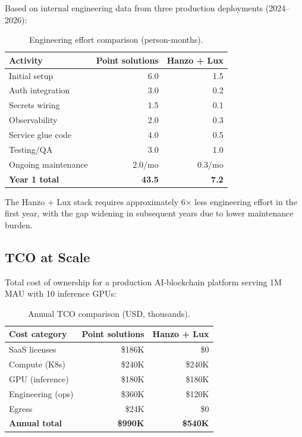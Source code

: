\documentclass[11pt,twocolumn]{article}
\begin{document}
Based on internal engineering data from three production deployments (2024--2026):

\begin{table}[H]
\centering
\caption{Engineering effort comparison (person-months).}
\footnotesize
\begin{tabular}{@{}lrr@{}}
\toprule
Activity & Point solutions & Hanzo + Lux \\
\midrule
Initial setup & 6.0 & 1.5 \\
Auth integration & 3.0 & 0.2 \\
Secrets wiring & 1.5 & 0.1 \\
Observability & 2.0 & 0.3 \\
Service glue code & 4.0 & 0.5 \\
Testing/QA & 3.0 & 1.0 \\
Ongoing maintenance & 2.0/mo & 0.3/mo \\
\midrule
\textbf{Year 1 total} & \textbf{43.5} & \textbf{7.2} \\
\bottomrule
\end{tabular}
\end{table}

The Hanzo + Lux stack requires approximately 6$\times$ less engineering effort in the first year, with the gap widening in subsequent years due to lower maintenance burden.

\subsection{TCO at Scale}

Total cost of ownership for a production AI-blockchain platform serving 1M MAU with 10 inference GPUs:

\begin{table}[H]
\centering
\caption{Annual TCO comparison (USD, thousands).}
\footnotesize
\begin{tabular}{@{}lrr@{}}
\toprule
Cost category & Point solutions & Hanzo + Lux \\
\midrule
SaaS licenses & \$186K & \$0 \\
Compute (K8s) & \$240K & \$240K \\
GPU (inference) & \$180K & \$180K \\
Engineering (ops) & \$360K & \$120K \\
Egress & \$24K & \$0 \\
\midrule
\textbf{Annual total} & \textbf{\$990K} & \textbf{\$540K} \\
\bottomrule
\end{tabular}
\end{table}
\end{document}
